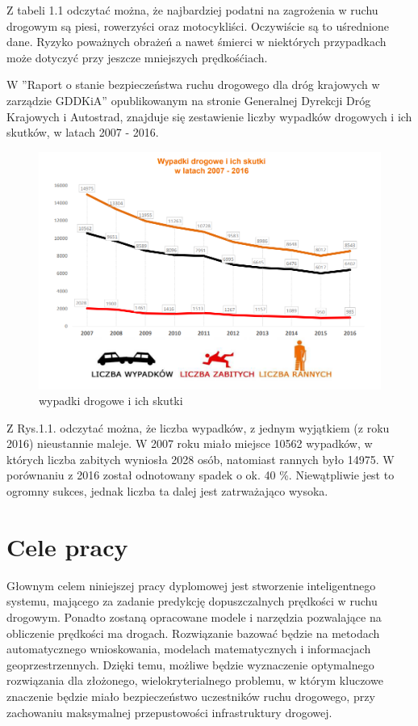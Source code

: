 Z tabeli 1.1 odczytać można, że najbardziej podatni na zagrożenia w ruchu drogowym są piesi, rowerzyści oraz motocykliści. Oczywiście są to uśrednione dane. Ryzyko poważnych obrażeń a nawet śmierci w niektórych przypadkach może dotyczyć przy jeszcze mniejszych prędkośćiach.

\newpage


W ''Raport o stanie bezpieczeństwa ruchu drogowego dla dróg krajowych w zarządzie GDDKiA'' opublikowanym na stronie Generalnej Dyrekcji Dróg Krajowych i Autostrad, znajduje się zestawienie liczby wypadków drogowych i ich skutków, w latach 2007 - 2016.

\begin{figure}[h]
\caption{wypadki drogowe i ich skutki}
\centering
\includegraphics[width=1.1\textwidth]{picture1}
\end{figure}

Z Rys.1.1. odczytać można, że liczba wypadków, z jednym wyjątkiem (z roku 2016) nieustannie maleje. W 2007 roku miało miejsce 10562 wypadków, w których liczba zabitych wyniosła 2028 osób, natomiast rannych było 14975. W porównaniu z 2016 został odnotowany spadek o ok. 40 \%. Niewątpliwie jest to ogromny sukces, jednak liczba ta dalej jest zatrważająco wysoka. 

\newpage
\section{Cele pracy}
\label{sec:celePracy}

Głownym celem niniejszej pracy dyplomowej jest stworzenie inteligentnego systemu, mającego za zadanie predykcję dopuszczalnych prędkości w ruchu drogowym. Ponadto zostaną opracowane modele i narzędzia pozwalające na obliczenie prędkości ma drogach. Rozwiązanie bazować będzie na metodach automatycznego wnioskowania, modelach matematycznych i informacjach geoprzestrzennych. Dzięki temu, możliwe będzie wyznaczenie optymalnego rozwiązania dla złożonego, wielokryterialnego problemu, w którym kluczowe znaczenie będzie miało bezpieczeństwo uczestników ruchu drogowego, przy zachowaniu maksymalnej przepustowości infrastruktury drogowej.

